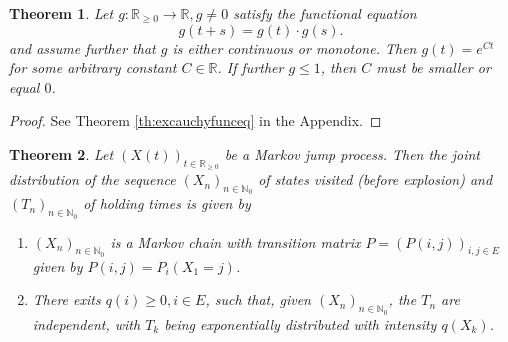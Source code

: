 \documentclass[12pt,a4paper]{scrartcl}
\newtheorem{theorem}{Theorem}[section]
\numberwithin{equation}{section}
\newcommand{\R}{\mathbb{R}} %
\newcommand{\N}{\mathbb{N}} %
\begin{document}
\begin{theorem}
Let $g:\R_{\geq 0} \to \R, g \neq 0$ satisfy the functional equation
\begin{equation}
g\left(t+s\right) = g\left(t\right) \cdot g\left(s\right).
\end{equation} 
and assume further that $g$ is either continuous or monotone.
Then $g\left(t\right) = e^{Ct}$ for some arbitrary constant $C \in \R$. If further $g \leq 1$, then $C$ must be smaller or equal $0$.
\end{theorem}
\begin{proof}
See Theorem \ref{th:excauchyfunceq} in the Appendix.
\end{proof}


\begin{theorem}
\label{th:embeddedchainandholdingtimes}
Let $\left(X\left(t\right)\right)_{t \in \R_{\geq 0}}$ be a Markov jump process. Then the joint distribution of the sequence $ \left(X_n\right)_{n \in \N_0} $ of states visited (before explosion) and $\left(T_n\right)_{n \in \N_0}$ of holding times is given by 
\begin{enumerate}
\item $ \left(X_n\right)_{n \in \N_0} $ is a Markov chain with transition matrix $ P = \left(P\left(i,j\right)\right)_{i,j \in E} $ given by $ P\left(i,j\right) = P_i\left(X_1 = j\right) $.
\item There exits $ q\left(i\right) \geq 0 , i \in E$, such that, given $ \left(X_n\right)_{n \in \N_0} $, the $ T_n $ are independent, with $T_k$ being exponentially distributed with intensity $q\left(X_k\right)$.
\end{enumerate}
\end{theorem}
\end{document}
